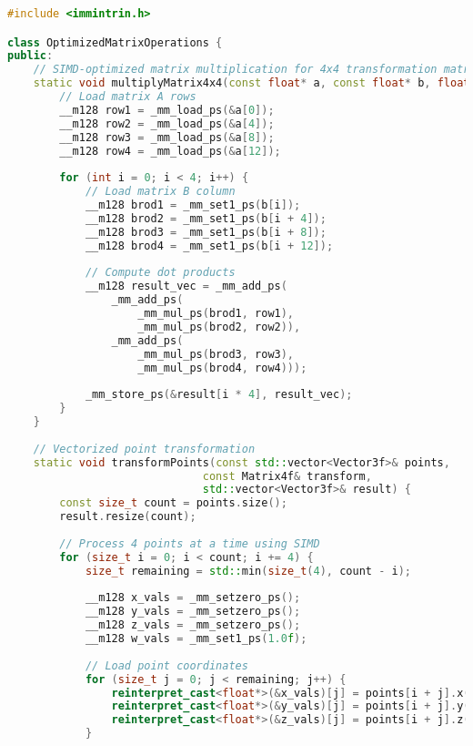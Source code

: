 \begin{lstlisting}[language=C++, caption=SIMD-Optimized Matrix Operations]
#include <immintrin.h>

class OptimizedMatrixOperations {
public:
    // SIMD-optimized matrix multiplication for 4x4 transformation matrices
    static void multiplyMatrix4x4(const float* a, const float* b, float* result) {
        // Load matrix A rows
        __m128 row1 = _mm_load_ps(&a[0]);
        __m128 row2 = _mm_load_ps(&a[4]);
        __m128 row3 = _mm_load_ps(&a[8]);
        __m128 row4 = _mm_load_ps(&a[12]);
        
        for (int i = 0; i < 4; i++) {
            // Load matrix B column
            __m128 brod1 = _mm_set1_ps(b[i]);
            __m128 brod2 = _mm_set1_ps(b[i + 4]);
            __m128 brod3 = _mm_set1_ps(b[i + 8]);
            __m128 brod4 = _mm_set1_ps(b[i + 12]);
            
            // Compute dot products
            __m128 result_vec = _mm_add_ps(
                _mm_add_ps(
                    _mm_mul_ps(brod1, row1),
                    _mm_mul_ps(brod2, row2)),
                _mm_add_ps(
                    _mm_mul_ps(brod3, row3),
                    _mm_mul_ps(brod4, row4)));
            
            _mm_store_ps(&result[i * 4], result_vec);
        }
    }
    
    // Vectorized point transformation
    static void transformPoints(const std::vector<Vector3f>& points,
                              const Matrix4f& transform,
                              std::vector<Vector3f>& result) {
        const size_t count = points.size();
        result.resize(count);
        
        // Process 4 points at a time using SIMD
        for (size_t i = 0; i < count; i += 4) {
            size_t remaining = std::min(size_t(4), count - i);
            
            __m128 x_vals = _mm_setzero_ps();
            __m128 y_vals = _mm_setzero_ps();
            __m128 z_vals = _mm_setzero_ps();
            __m128 w_vals = _mm_set1_ps(1.0f);
            
            // Load point coordinates
            for (size_t j = 0; j < remaining; j++) {
                reinterpret_cast<float*>(&x_vals)[j] = points[i + j].x();
                reinterpret_cast<float*>(&y_vals)[j] = points[i + j].y();
                reinterpret_cast<float*>(&z_vals)[j] = points[i + j].z();
            }
            

\end{lstlisting}
